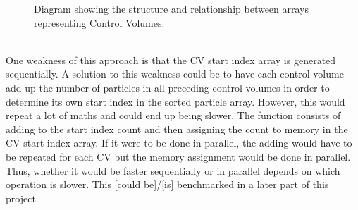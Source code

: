 \documentclass[10pt,a4paper,titlepage]{report}
\begin{document}
\begin{figure}[!ht]
\centering

\caption{Diagram showing the structure and relationship between arrays representing Control Volumes.}
\label{fig:cv_array_structure}
\end{figure}
\\One weakness of this approach is that the CV start index array is generated sequentially. A solution to this weakness could be to have each control volume add up the number of particles in all preceding control volumes in order to determine its own start index in the sorted particle array. However, this would repeat a lot of maths and could end up being slower. The function consists of adding to the start index count and then assigning the count to memory in the CV start index array. If it were to be done in parallel, the adding would have to be repeated for each CV but the memory assignment would be done in parallel. Thus, whether it would be faster sequentially or in parallel depends on which operation is slower. This [could be]/[is] benchmarked in a later part of this project. %
\end{document}
